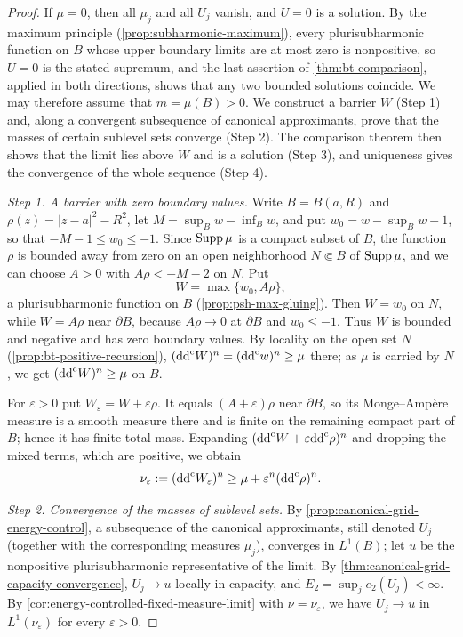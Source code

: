 \begin{proof}
If $\mu=0$, then all $\mu_j$ and all $U_j$ vanish, and $U=0$ is a solution. By the maximum principle (\cref{prop:subharmonic-maximum}), every plurisubharmonic function on $B$ whose upper boundary limits are at most zero is nonpositive, so $U=0$ is the stated supremum, and the last assertion of \cref{thm:bt-comparison}, applied in both directions, shows that any two bounded solutions coincide. We may therefore assume that $m=\mu(B)>0$. We construct a barrier $W$ (Step 1) and, along a convergent subsequence of canonical approximants, prove that the masses of certain sublevel sets converge (Step 2). The comparison theorem then shows that the limit lies above $W$ and is a solution (Step 3), and uniqueness gives the convergence of the whole sequence (Step 4).

\emph{Step 1. A barrier with zero boundary values.}
Write $B=B(a,R)$ and $\rho(z)=|z-a|^2-R^2$, let $M=\sup_Bw-\inf_Bw$, and put $w_0=w-\sup_Bw-1$, so that $-M-1\leq w_0\leq-1$. Since $\operatorname{Supp}\mu$ is a compact subset of $B$, the function $\rho$ is bounded away from zero on an open neighborhood $N\Subset B$ of $\operatorname{Supp}\mu$, and we can choose $A>0$ with $A\rho<-M-2$ on $N$. Put
\[
 W=\max\{w_0,A\rho\},
\]
a plurisubharmonic function on $B$ (\cref{prop:psh-max-gluing}). Then $W=w_0$ on $N$, while $W=A\rho$ near $\partial B$, because $A\rho\to0$ at $\partial B$ and $w_0\leq-1$. Thus $W$ is bounded and negative and has zero boundary values. By locality on the open set $N$ (\cref{prop:bt-positive-recursion}), $(\mathrm{dd}^{\mathrm{c}} W)^n=(\mathrm{dd}^{\mathrm{c}} w)^n\geq\mu$ there; as $\mu$ is carried by $N$, we get $(\mathrm{dd}^{\mathrm{c}} W)^n\geq\mu$ on $B$.

For $\varepsilon>0$ put $W_\varepsilon=W+\varepsilon\rho$. It equals $(A+\varepsilon)\rho$ near $\partial B$, so its Monge--Amp\`ere measure is a smooth measure there and is finite on the remaining compact part of $B$; hence it has finite total mass. Expanding $(\mathrm{dd}^{\mathrm{c}} W+\varepsilon\mathrm{dd}^{\mathrm{c}}\rho)^n$ and dropping the mixed terms, which are positive, we obtain
\begin{equation}\label{eq:local-subsolution-strict-barrier}
 \nu_\varepsilon:=(\mathrm{dd}^{\mathrm{c}} W_\varepsilon)^n
                       \geq\mu+\varepsilon^n(\mathrm{dd}^{\mathrm{c}}\rho)^n.
\end{equation}

\emph{Step 2. Convergence of the masses of sublevel sets.}
By \cref{prop:canonical-grid-energy-control}, a subsequence of the canonical approximants, still denoted $U_j$ (together with the corresponding measures $\mu_j$), converges in $L^1(B)$; let $u$ be the nonpositive plurisubharmonic representative of the limit. By \cref{thm:canonical-grid-capacity-convergence}, $U_j\to u$ locally in capacity, and $E_2=\sup_je_2(U_j)<\infty$. By \cref{cor:energy-controlled-fixed-measure-limit} with $\nu=\nu_\varepsilon$, we have $U_j\to u$ in $L^1(\nu_\varepsilon)$ for every $\varepsilon>0$.


\end{proof}
